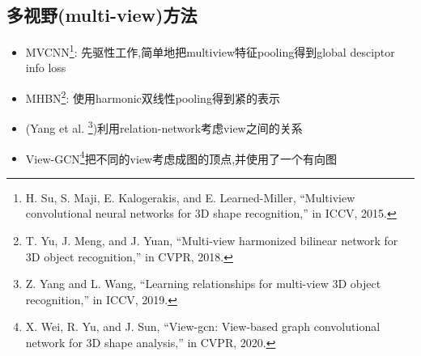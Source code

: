 \documentclass{article}
\begin{document}
\subsection{多视野(multi-view)方法}
\begin{itemize}
    \item MVCNN\footnote{H. Su, S. Maji, E. Kalogerakis, and E. Learned-Miller, “Multiview convolutional neural networks for 3D shape recognition,”
    in ICCV, 2015.}: 先驱性工作,简单地把multiview特征pooling得到global desciptor \tRarr info loss
    \item MHBN\footnote{T. Yu, J. Meng, and J. Yuan, “Multi-view harmonized bilinear
    network for 3D object recognition,” in CVPR, 2018.}: 使用harmonic双线性pooling得到紧的表示
    \item (Yang et al. \footnote{Z. Yang and L. Wang, “Learning relationships for multi-view 3D object recognition,” in ICCV, 2019.})利用relation-network考虑view之间的关系
    \item View-GCN\footnote{X. Wei, R. Yu, and J. Sun, “View-gcn: View-based graph convolutional network for 3D shape analysis,” in CVPR, 2020.}把不同的view考虑成图的顶点,并使用了一个有向图
\end{itemize}
\end{document}
